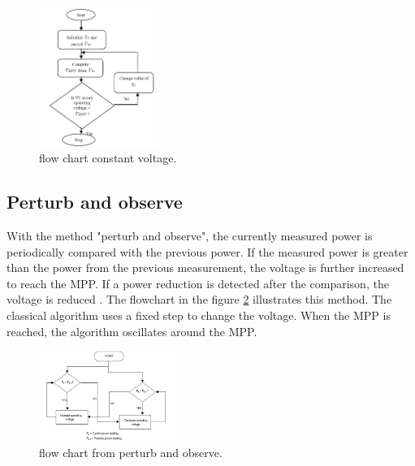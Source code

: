 \begin{figure}[htbp]
	\begin{center}
		\includegraphics[width=0.35\textwidth]{../Pictures/P1/Flow_chart/Flow_chart_constant_voltage}
		\caption{flow chart constant voltage\cite{}. }
		\label{fcconstantvoltage}
	\end{center}	
\end{figure}

\subsection{Perturb and observe}
With the method "perturb and observe", the currently measured power is periodically compared with the previous power. If the measured power is greater than the power from the previous measurement, the voltage is further increased to reach the MPP. If a power reduction is detected after the comparison, the voltage is reduced . The flowchart in the figure \ref{fcperturbandobserve} illustrates this method. The classical algorithm uses a fixed step to change the voltage. When the MPP is reached, the algorithm oscillates around the MPP\cite{}. 

\begin{figure}[htbp]
	\begin{center}
		\includegraphics[width=0.4\textwidth]{../Pictures/P1/Flow_chart/flow_chart_perturb_observe}
		\caption{flow chart from perturb and observe\cite{}.}
		\label{fcperturbandobserve}
	\end{center}	
\end{figure}

